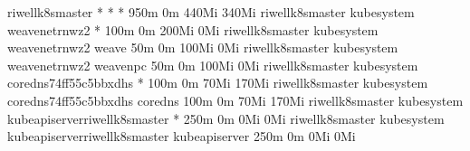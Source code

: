 \documentclass[letterpaper,10pt,english]{sphinxmanual}
\begin{document}
\begin{sphinxVerbatim}[commandchars=\\\{\}]
riwell\PYGZhy{}k8s\PYGZhy{}master   *             *                                           *                         950m \PYGZpc{}     0m \PYGZpc{}      440Mi \PYGZpc{}        340Mi \PYGZpc{}
riwell\PYGZhy{}k8s\PYGZhy{}master   kube\PYGZhy{}system   weave\PYGZhy{}net\PYGZhy{}rnwz2                             *                         100m \PYGZpc{}      0m \PYGZpc{}      200Mi \PYGZpc{}        0Mi \PYGZpc{}
riwell\PYGZhy{}k8s\PYGZhy{}master   kube\PYGZhy{}system   weave\PYGZhy{}net\PYGZhy{}rnwz2                             weave                     50m \PYGZpc{}       0m \PYGZpc{}      100Mi \PYGZpc{}        0Mi \PYGZpc{}
riwell\PYGZhy{}k8s\PYGZhy{}master   kube\PYGZhy{}system   weave\PYGZhy{}net\PYGZhy{}rnwz2                             weave\PYGZhy{}npc                 50m \PYGZpc{}       0m \PYGZpc{}      100Mi \PYGZpc{}        0Mi \PYGZpc{}
riwell\PYGZhy{}k8s\PYGZhy{}master   kube\PYGZhy{}system   coredns\PYGZhy{}74ff55c5b\PYGZhy{}bxdhs                     *                         100m \PYGZpc{}      0m \PYGZpc{}      70Mi \PYGZpc{}         170Mi \PYGZpc{}
riwell\PYGZhy{}k8s\PYGZhy{}master   kube\PYGZhy{}system   coredns\PYGZhy{}74ff55c5b\PYGZhy{}bxdhs                     coredns                   100m \PYGZpc{}      0m \PYGZpc{}      70Mi \PYGZpc{}         170Mi \PYGZpc{}
riwell\PYGZhy{}k8s\PYGZhy{}master   kube\PYGZhy{}system   kube\PYGZhy{}apiserver\PYGZhy{}riwell\PYGZhy{}k8s\PYGZhy{}master            *                         250m \PYGZpc{}     0m \PYGZpc{}      0Mi \PYGZpc{}          0Mi \PYGZpc{}
riwell\PYGZhy{}k8s\PYGZhy{}master   kube\PYGZhy{}system   kube\PYGZhy{}apiserver\PYGZhy{}riwell\PYGZhy{}k8s\PYGZhy{}master            kube\PYGZhy{}apiserver            250m \PYGZpc{}     0m \PYGZpc{}      0Mi \PYGZpc{}          0Mi \PYGZpc{}

\end{sphinxVerbatim}
\end{document}
